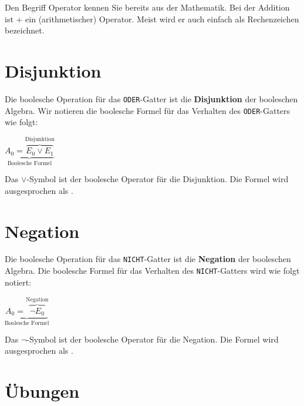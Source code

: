 \begin{hinweis}
Den Begriff Operator kennen Sie bereits aus der Mathematik. Bei der Addition ist $+$ ein (arithmetischer) Operator. Meist wird er auch einfach als Rechenzeichen bezeichnet.
\end{hinweis}

\section{Disjunktion}

Die boolesche Operation für das \texttt{ODER}-Gatter ist die \textbf{Disjunktion} der booleschen Algebra. Wir notieren die boolesche Formel für das Verhalten des \texttt{ODER}-Gatters wie folgt:

\begin{center}
\Large
$\underbrace{A_0 = \overbrace{E_0 \vee E_1}^{\text{Disjunktion}}}_{\text{Boolesche Formel}}$
\end{center}

Das $\vee$-Symbol ist der boolesche Operator für die Disjunktion. Die Formel wird ausgesprochen als .

\section{Negation}

Die boolesche Operation für das \texttt{NICHT}-Gatter ist die \textbf{Negation} der booleschen Algebra. Die boolesche Formel für das Verhalten des \texttt{NICHT}-Gatters wird wie folgt notiert:

\begin{center}
\Large
$\underbrace{A_0 = \overbrace{\neg E_0}^{\text{Negation}}}_{\text{Boolesche Formel}}$
\end{center}

Das $\neg$-Symbol ist der boolesche Operator für die Negation. Die Formel wird ausgesprochen als .

\section{Übungen}

